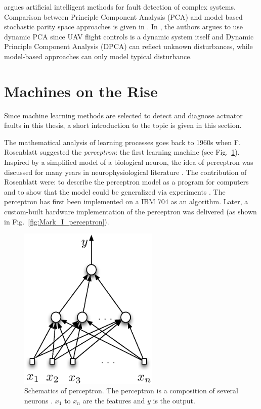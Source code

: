 \cite{gui2002fault} argues artificial intelligent methods for fault detection of complex 
systems. Comparison between Principle Component Analysis (PCA) and model based stochastic parity space 
approaches is given in \cite{hagenblad2004comparison}.
In \cite{li2016data}, the authors argues to use dynamic PCA since UAV flight 
controls is a dynamic system itself and Dynamic Principle Component Analysis (DPCA) can reflect unknown disturbances, 
while model-based approaches can only model typical disturbance.  

\section{Machines on the Rise}

Since machine learning methods are selected to detect and diagnose actuator faults in this thesis, a short introduction to the topic is given in this section. 

The mathematical analysis of learning processes goes back to 1960s when F. Rosenblatt \cite{rosenblatt1958perceptron} suggested the \emph{perceptron}: the first learning machine \cite{vapnik2013nature} (see Fig.~\ref{fig:perceptron}). 
Inspired by a simplified model of a biological neuron, the idea of perceptron was discussed for many years in neurophysiological literature \cite{vapnik2013nature}. The contribution of Rosenblatt were: to describe the perceptron model as a program for computers and to show that the model could be generalized via experiments \cite{vapnik2013nature}.
The perceptron has first been implemented on a IBM 704 as an algorithm. 
Later, a custom-built hardware implementation of the perceptron was delivered (as shown in Fig.~\ref{fig:Mark_I_perceptron}).

\begin{figure}
\begin{center}
\includegraphics[width=6.7cm]{figures/perceptron}
\caption{Schematics of perceptron. The perceptron is a composition of several neurons \cite{vapnik2013nature}. $x_1$ to $x_n$ are the features and $y$ is the output.} 
\label{fig:perceptron}
\end{center}
\end{figure}

